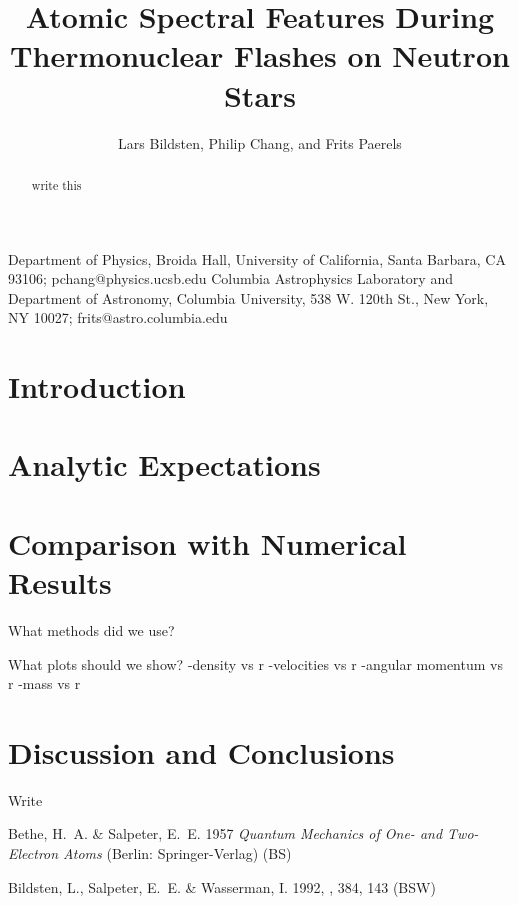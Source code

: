\documentclass[iop,apjl,letterpaper]{emulateapj}
\begin{document}
\title{Atomic Spectral Features During Thermonuclear Flashes on 
Neutron Stars}

\author{Lars Bildsten, Philip Chang,
and Frits Paerels}
{Department of Physics, Broida Hall, University of California,
Santa Barbara, CA 93106; pchang@physics.ucsb.edu}
{Columbia Astrophysics Laboratory and Department of Astronomy,
Columbia University, 538 W. 120th St., New York, NY 10027;
frits@astro.columbia.edu}


\begin{abstract}

write this

\end{abstract}


\section{Introduction}

\section{Analytic Expectations}
\section{Comparison with Numerical Results}

What methods did we use?

What plots should we show?
-density vs r
-velocities vs r
-angular momentum vs r
-mass vs r

\begin{figure}
\end{figure}

\begin{figure}
\end{figure}

\section{Discussion and Conclusions}

\acknowledgments

Write

\begin{references}

\noindent
Bethe, H.~A. \& Salpeter, E.~E. 1957 \textit{Quantum Mechanics of One-
  and Two-Electron Atoms} (Berlin: Springer-Verlag) (BS) 

\noindent
Bildsten, L., Salpeter, E.~E. \& Wasserman, I. 1992, \apj, 384, 143
(BSW) 


\end{references}
\end{document}
